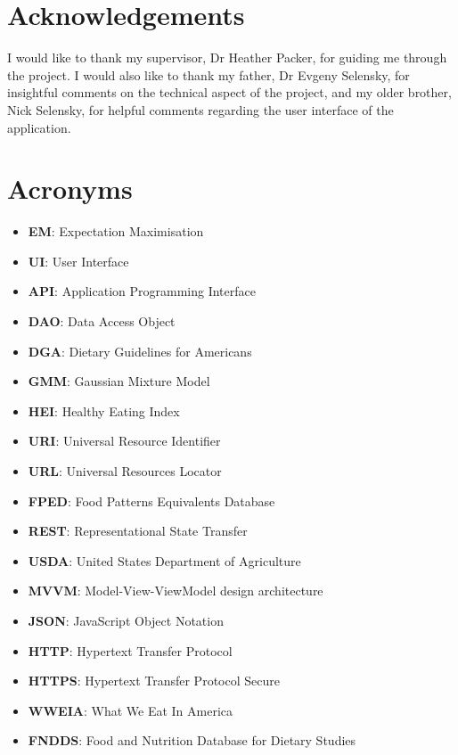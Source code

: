 \documentclass{article}
\begin{document}
\newpage
\section{Acknowledgements}
I would like to thank my supervisor, Dr Heather Packer, for guiding me through the project. I would also like to thank my father, Dr Evgeny Selensky, for insightful comments on the technical aspect of the project, and my older brother, Nick Selensky, for helpful comments regarding the user interface of the application.

\newpage
\tableofcontents

\newpage
\section{Acronyms}
\begin{itemize}
    \item \textbf{EM}: Expectation Maximisation
    \item \textbf{UI}: User Interface
    \item \textbf{API}: Application Programming Interface
    \item \textbf{DAO}: Data Access Object
    \item \textbf{DGA}: Dietary Guidelines for Americans
    \item \textbf{GMM}: Gaussian Mixture Model
    \item \textbf{HEI}: Healthy Eating Index
    \item \textbf{URI}: Universal Resource Identifier
    \item \textbf{URL}: Universal Resources Locator
    \item \textbf{FPED}: Food Patterns Equivalents Database
    \item \textbf{REST}: Representational State Transfer
    \item \textbf{USDA}: United States Department of Agriculture
    \item \textbf{MVVM}: Model-View-ViewModel design architecture
    \item \textbf{JSON}: JavaScript Object Notation
    \item \textbf{HTTP}: Hypertext Transfer Protocol
    \item \textbf{HTTPS}: Hypertext Transfer Protocol Secure
    \item \textbf{WWEIA}: What We Eat In America
    \item \textbf{FNDDS}: Food and Nutrition Database for Dietary Studies
\end{itemize}
\end{document}
